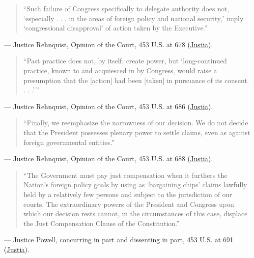\documentclass[12pt]{article}
\begin{document}
\begin{quote}
``Such failure of Congress specifically to delegate authority does not, `especially . . . in the areas of foreign policy and national security,' imply `congressional disapproval' of action taken by the Executive.''
\end{quote}
\noindent --- Justice Rehnquist, Opinion of the Court, 453 U.S. at 678 (\href{https://supreme.justia.com/cases/federal/us/453/654/}{Justia}).

\begin{quote}
``Past practice does not, by itself, create power, but `long-continued practice, known to and acquiesced in by Congress, would raise a presumption that the [action] had been [taken] in pursuance of its consent. . . .'\,''
\end{quote}
\noindent --- Justice Rehnquist, Opinion of the Court, 453 U.S. at 686 (\href{https://supreme.justia.com/cases/federal/us/453/654/}{Justia}).

\begin{quote}
``Finally, we reemphasize the narrowness of our decision. We do not decide that the President possesses plenary power to settle claims, even as against foreign governmental entities.''
\end{quote}
\noindent --- Justice Rehnquist, Opinion of the Court, 453 U.S. at 688 (\href{https://supreme.justia.com/cases/federal/us/453/654/}{Justia}).

\begin{quote}
``The Government must pay just compensation when it furthers the Nation's foreign policy goals by using as `bargaining chips' claims lawfully held by a relatively few persons and subject to the jurisdiction of our courts. The extraordinary powers of the President and Congress upon which our decision rests cannot, in the circumstances of this case, displace the Just Compensation Clause of the Constitution.''
\end{quote}
\noindent --- Justice Powell, concurring in part and dissenting in part, 453 U.S. at 691 (\href{https://supreme.justia.com/cases/federal/us/453/654/}{Justia}).
\end{document}
